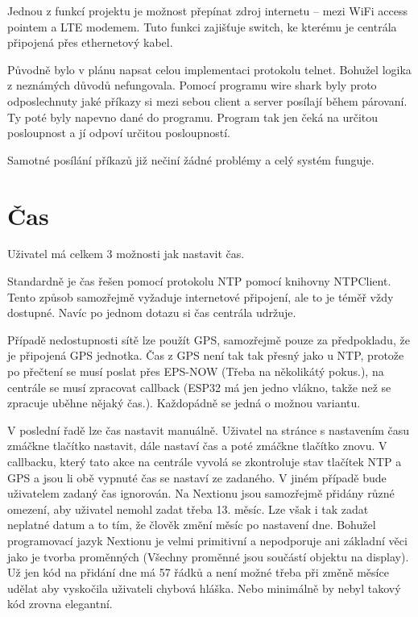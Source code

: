\documentclass[a4paper,oneside,12pt]{report}
\begin{document}
Jednou z funkcí projektu je možnost přepínat zdroj internetu -- mezi WiFi access pointem a LTE modemem.
Tuto funkci zajišťuje switch, ke kterému je centrála připojená přes ethernetový kabel.

Původně bylo v plánu napsat celou implementaci protokolu telnet.
Bohužel logika z neznámých důvodů nefungovala.
Pomocí programu wire shark byly proto odposlechnuty jaké příkazy si mezi sebou client a server posílají během párovaní.
Ty poté byly napevno dané do programu.
Program tak jen čeká na určitou posloupnost a jí odpoví určitou posloupností.

Samotné posílání příkazů již nečiní žádné problémy a celý systém funguje.

\section{Čas}

Uživatel má celkem 3 možnosti jak nastavit čas.

Standardně je čas řešen pomocí protokolu NTP pomocí knihovny NTPClient.
Tento způsob samozřejmě vyžaduje internetové připojení, ale to je téměř vždy dostupné.
Navíc po jednom dotazu si čas centrála udržuje.

Případě nedostupnosti sítě lze použít GPS, samozřejmě pouze za předpokladu, že je připojená GPS jednotka.
Čas z GPS není tak tak přesný jako u NTP, protože po přečtení se musí poslat přes EPS-NOW (Třeba na několikátý pokus.), na centrále se musí zpracovat callback (ESP32 má jen jedno vlákno, takže než se zpracuje uběhne nějaký čas.).
Každopádně se jedná o možnou variantu.

V poslední řadě lze čas nastavit manuálně.
Uživatel na stránce s nastavením času zmáčkne tlačítko nastavit, dále nastaví čas a poté zmáčkne tlačítko znovu.
V callbacku, který tato akce na centrále vyvolá se zkontroluje stav tlačítek NTP a GPS a jsou li obě vypnuté čas se nastaví ze zadaného.
V jiném případě bude uživatelem zadaný čas ignorován.
Na Nextionu jsou samozřejmě přidány různé omezení, aby uživatel nemohl zadat třeba 13. měsíc.
Lze však i tak zadat neplatné datum a to tím, že člověk změní měsíc po nastavení dne.
Bohužel programovací jazyk Nextionu je velmi primitivní a nepodporuje ani základní věci jako je tvorba proměnných (Všechny proměnné jsou součástí objektu na display).
Už jen kód na přidání dne má 57 řádků a není možné třeba při změně měsíce udělat aby vyskočila uživateli chybová hláška.
Nebo minimálně by nebyl takový kód zrovna elegantní.
\end{document}
